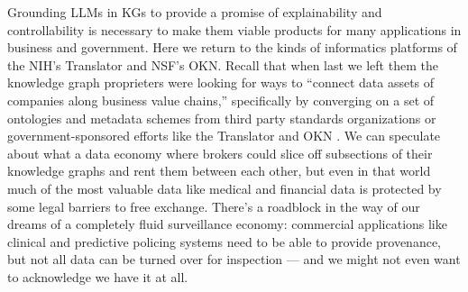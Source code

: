 Grounding LLMs in KGs to provide a promise of explainability and
controllability is necessary to make them viable products for many
applications in business and government. Here we return to the kinds of
informatics platforms of the NIH's Translator and NSF's OKN. Recall that
when last we left them the knowledge graph proprieters were looking for
ways to ``connect data assets of companies along business value
chains,'' specifically by converging on a set of ontologies and metadata
schemes from third party standards organizations or government-sponsored
efforts like the Translator and OKN \cite{panExploitingLinkedData2017} . We can speculate about what a data
economy where brokers could slice off subsections of their knowledge
graphs and rent them between each other, but even in that world much of
the most valuable data like medical and financial data is protected by
some legal barriers to free exchange. There's a roadblock in the way of
our dreams of a completely fluid surveillance economy: commercial
applications like clinical and predictive policing systems need to be
able to provide provenance, but not all data can be turned over for
inspection --- and we might not even want to acknowledge we have it at
all.

